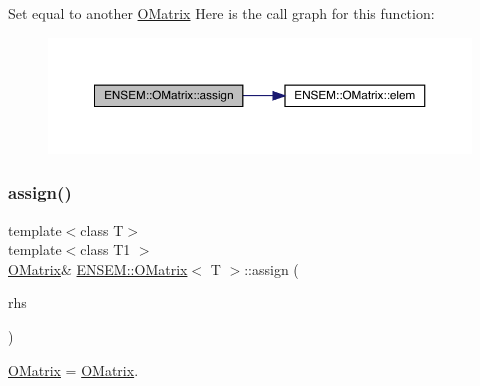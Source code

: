 Set equal to another \mbox{\hyperlink{classENSEM_1_1OMatrix}{O\+Matrix}} Here is the call graph for this function\+:
\nopagebreak
\begin{figure}[H]
\begin{center}
\leavevmode
\includegraphics[width=350pt]{dd/d80/classENSEM_1_1OMatrix_a37ed216c9ecfe42f7a357573699b3bfc_cgraph}
\end{center}
\end{figure}
\mbox{\label{classENSEM_1_1OMatrix_a37ed216c9ecfe42f7a357573699b3bfc}} 
\subsubsection{\texorpdfstring{assign()}{assign()}\hspace{0.1cm}{\footnotesize\ttfamily [6/6]}}
{\footnotesize\ttfamily template$<$class T$>$ \\
template$<$class T1 $>$ \\
\mbox{\hyperlink{classENSEM_1_1OMatrix}{O\+Matrix}}\& \mbox{\hyperlink{classENSEM_1_1OMatrix}{E\+N\+S\+E\+M\+::\+O\+Matrix}}$<$ T $>$\+::assign (\begin{DoxyParamCaption}\item[{const \mbox{\hyperlink{classENSEM_1_1OMatrix}{O\+Matrix}}$<$ T1 $>$ \&}]{rhs }\end{DoxyParamCaption})\hspace{0.3cm}{\ttfamily [inline]}}



\mbox{\hyperlink{classENSEM_1_1OMatrix}{O\+Matrix}} = \mbox{\hyperlink{classENSEM_1_1OMatrix}{O\+Matrix}}. 

